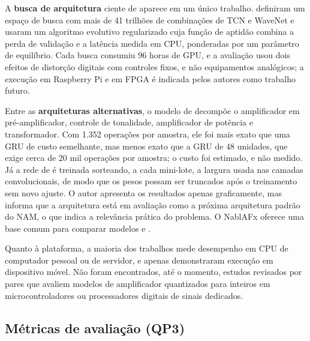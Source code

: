 \documentclass[%
  a4paper,%
  12pt,%
  fleqn,%
  english,%
  brazilian,%
]{article}
\begin{document}
A \textbf{busca de arquitetura} ciente de  aparece em um único trabalho.
\textcite{Ringhofer2024} definiram um espaço de busca com mais de 41 trilhões de combinações de TCN e WaveNet e usaram um algoritmo evolutivo regularizado cuja função de aptidão combina a perda de validação e a latência medida em CPU, ponderadas por um parâmetro de equilíbrio.
Cada busca consumiu 96 horas de GPU, e a avaliação usou dois efeitos de distorção digitais com controles fixos, e não equipamentos analógicos; a execução em Raspberry Pi e em FPGA é indicada pelos autores como trabalho futuro.

Entre as \textbf{arquiteturas alternativas}, o modelo  de \textcite{Yeh2024} decompõe o amplificador em pré-amplificador, controle de tonalidade, amplificador de potência e transformador.
Com 1.352 operações por amostra, ele foi mais exato que uma GRU de custo semelhante, mas menos exato que a GRU de 48 unidades, que exige cerca de 20 mil operações por amostra; o custo foi estimado, e não medido.
Já a rede  de \textcite{Atkinson2025} é treinada sorteando, a cada mini-lote, a largura usada nas camadas convolucionais, de modo que os pesos possam ser truncados após o treinamento sem novo ajuste.
O autor apresenta os resultados apenas graficamente, mas informa que a arquitetura está em avaliação como a próxima arquitetura padrão do NAM, o que indica a relevância prática do problema.
O  NablAFx \cite{Comunita2025} oferece uma base comum para comparar modelos  e .

Quanto à plataforma, a maioria dos trabalhos mede desempenho em CPU de computador pessoal ou de servidor, e apenas \textcite{Sato2026} demonstraram execução em dispositivo móvel.
Não foram encontrados, até o momento, estudos revisados por pares que avaliem modelos de amplificador quantizados para inteiros em microcontroladores ou processadores digitais de sinais dedicados.

\subsection{Métricas de avaliação (QP3)}%
\label{ssect:qp3}
\end{document}

